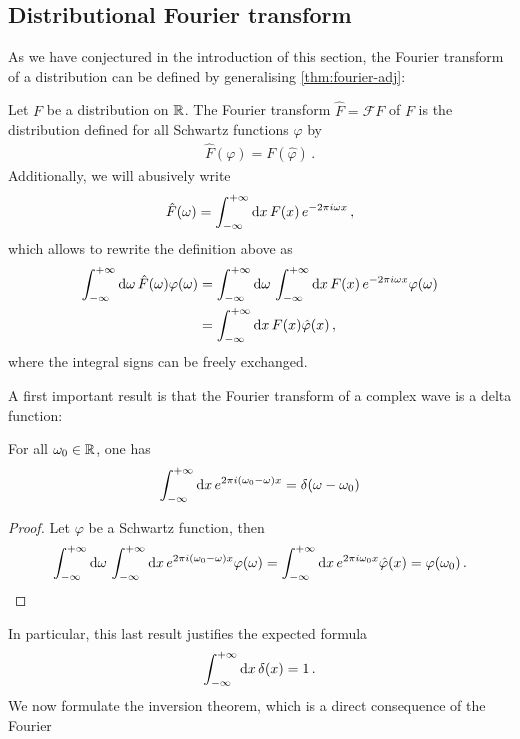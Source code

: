 \subsection{Distributional Fourier transform}
As we have conjectured in the introduction of this section, the Fourier transform of a
distribution can be defined by generalising \cref{thm:fourier-adj}:
\begin{definition}
	Let $F$ be a distribution on $\mathbb{R}$. The Fourier transform $\hat{F}=\mathcal{F}F$ of $F$
	is the distribution defined for all Schwartz functions $\varphi$ by
	\begin{align}
		\hat{F}(\varphi)=F(\hat{\varphi})\,.
	\end{align}
	Additionally, we will abusively write
	\begin{equation}
		\hat{F}(\omega)=\int_{-\infty}^{+\infty}\mathrm{d}{x}\,F(x)\,e^{-2\pi i \omega x}\,,
	\end{equation}
	which allows to rewrite the definition above as
	\begin{align}
		\int_{-\infty}^{+\infty}\mathrm{d}{\omega}\,\hat{F}(\omega)\varphi(\omega) & =\int_{-\infty}^{+\infty}\mathrm{d}{\omega}\,
		\int_{-\infty}^{+\infty}\mathrm{d}{x}\,F(x)\,e^{-2\pi i \omega x}\varphi(\omega)\notag                        \\
		                                            & =\int_{-\infty}^{+\infty}\mathrm{d}{x}\,F(x)\hat{\varphi}(x)\,,
		\label{eq:fourier-adj-dist}
	\end{align}
	where the integral signs can be freely exchanged.
\end{definition}
A first important result is that the Fourier transform of a complex wave is a delta
function:
\begin{proposition}
	For all $\omega_0\in\mathbb{R}$, one has
	\begin{equation}
		\int_{-\infty}^{+\infty}\mathrm{d}{x}\,e^{2\pi i (\omega_0-\omega)x}=\delta(\omega-\omega_0)
	\end{equation}
\end{proposition}
\begin{proof}
	Let $\varphi$ be a Schwartz function, then
	\begin{equation}
		\int_{-\infty}^{+\infty}\mathrm{d}{\omega}\,\int_{-\infty}^{+\infty}\mathrm{d}{x}\,e^{2\pi i (\omega_0-\omega)x}\varphi(\omega)=
		\int_{-\infty}^{+\infty}\mathrm{d}{x}\,e^{2\pi i\omega_0x}\hat{\varphi}(x)=\varphi(\omega_0)\,.
	\end{equation}
\end{proof}
In particular, this last result justifies the expected formula
\begin{equation}
	\int_{-\infty}^{+\infty}\mathrm{d}{x}\,\delta(x)=1\,.
\end{equation}
We now formulate the inversion theorem, which is a direct consequence of the Fourier
